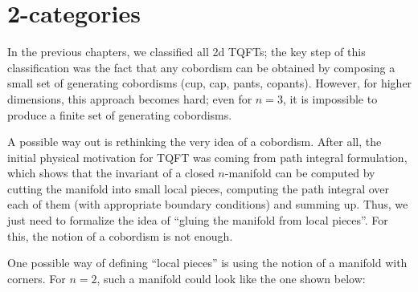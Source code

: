 \chapter{2-categories}\label{c:2categories}

In the previous chapters, we classified all 2d TQFTs; the key step of this
classification was the fact that any cobordism can be obtained by composing a
small set of generating cobordisms (cup, cap, pants, copants). However, for
higher dimensions, this approach becomes hard; even for $n=3$, it is impossible
to produce a finite set of generating cobordisms.

A possible way out is rethinking the very idea of a cobordism. After all, the
initial physical motivation for TQFT was coming from path integral formulation,
which shows that the invariant of a closed $n$-manifold can be computed by
cutting the manifold into small local pieces, computing the path integral over
each of them (with appropriate boundary conditions) and summing up. Thus, we
just need to  formalize the idea of ``gluing the manifold from local pieces''.
For this, the notion of a cobordism is not enough.

One possible way of defining ``local pieces'' is using the notion of a manifold
with corners. For $n=2$, such a manifold could look like the one shown below:


